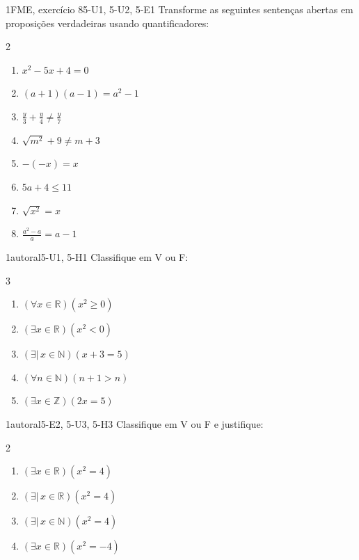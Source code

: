 \Questoes

\begin{questao}{1}{FME, exercício 8}{5-U1, 5-U2, 5-E1}\label{u5:q1}
Transforme as seguintes sentenças abertas em proposições verdadeiras usando quantificadores:
\begin{multicols}{2}
\begin{enumerate}[label=\alph*)]
  \item $x^2-5x+4=0$
  \item $(a+1)(a-1)=a^2-1$
  \item $\frac{y}{3}+\frac{y}{4}\neq\frac{y}{7}$
  \item $\sqrt{m^2}+9\neq m+3$
  \item $-(-x)=x$
  \item $5a+4\le11$
  \item $\sqrt{x^2}=x$
  \item $\frac{a^2-a}{a}=a-1$
\end{enumerate}
\end{multicols}
\end{questao}

\begin{questao}{1}{autoral}{5-U1, 5-H1}\label{u5:q2}
Classifique em V ou F:
\begin{multicols}{3}
\begin{enumerate}[label=\alph*)]
  \item $(\forall x\in\mathbb{R})(x^2\ge0)$
  \item $(\exists x\in\mathbb{R})(x^2<0)$
  \item $(\exists|\,x\in\mathbb{N})(x+3=5)$
  \item $(\forall n\in\mathbb{N})(n+1>n)$
  \item $(\exists x\in\mathbb{Z})(2x=5)$
\end{enumerate}
\end{multicols}
\end{questao}

\begin{questao}{1}{autoral}{5-E2, 5-U3, 5-H3}\label{u5:q3}
Classifique em V ou F e justifique:
\begin{multicols}{2}
\begin{enumerate}[label=\alph*)]
  \item $(\exists x\in\mathbb{R})(x^2=4)$
  \item $(\exists|\,x\in\mathbb{R})(x^2=4)$
  \item $(\exists|\,x\in\mathbb{N})(x^2=4)$
  \item $(\exists x\in\mathbb{R})(x^2=-4)$
\end{enumerate}
\end{multicols}
\end{questao}

